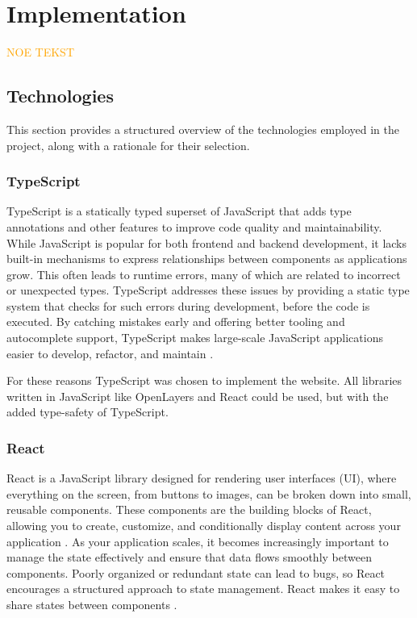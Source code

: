 \chapter{Implementation}\label{chap:implementation}

\textcolor{orange}{NOE TEKST}

\section{Technologies}

This section provides a structured overview of the technologies employed in the project, along with a rationale for their selection.

\subsection{TypeScript}

TypeScript is a statically typed superset of JavaScript that adds type annotations and other features to improve code quality and maintainability. While JavaScript is popular for both frontend and backend development, it lacks built-in mechanisms to express relationships between components as applications grow. This often leads to runtime errors, many of which are related to incorrect or unexpected types. TypeScript addresses these issues by providing a static type system that checks for such errors during development, before the code is executed. By catching mistakes early and offering better tooling and autocomplete support, TypeScript makes large-scale JavaScript applications easier to develop, refactor, and maintain \cite{typescript_handbook}. 

For these reasons TypeScript was chosen to implement the website. All libraries written in JavaScript like OpenLayers and React could be used, but with the added type-safety of TypeScript.

\subsection{React}\label{subsec:implementation:technologies:react}

React is a JavaScript library designed for rendering user interfaces (UI), where everything on the screen, from buttons to images, can be broken down into small, reusable components. These components are the building blocks of React, allowing you to create, customize, and conditionally display content across your application \cite{react_component}. As your application scales, it becomes increasingly important to manage the state effectively and ensure that data flows smoothly between components. Poorly organized or redundant state can lead to bugs, so React encourages a structured approach to state management. React makes it easy to share states between components \cite{react_managing_state}. 


